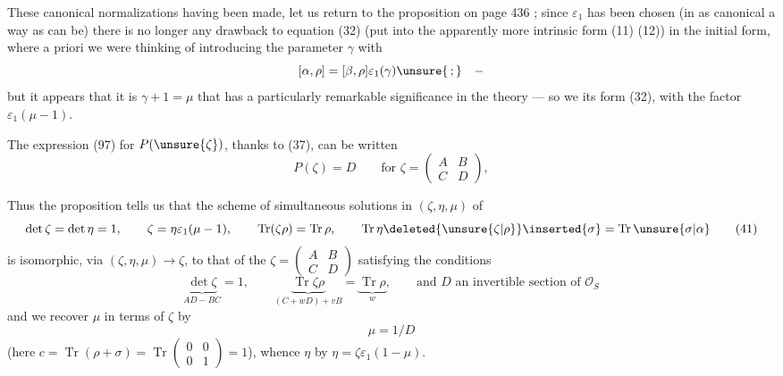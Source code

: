 
These canonical normalizations having been made, let us return to the proposition on page 436 ; since $\varepsilon_1$ has been chosen
(in as canonical a way as can be) there is no longer any drawback to
 equation (32) (put into the apparently more intrinsic form
(11)  (12)) in the  initial form,
where a priori we were thinking of introducing the parameter $\gamma$ with
\[
[\alpha,\rho]=[\beta,\rho]\varepsilon_1(\gamma)\unsure{\,;}\quad -
\]
but it appears that it is $\gamma+1=\mu$ that has a particularly remarkable significance
in the theory --- so we  its form (32), with the factor $\varepsilon_1(\mu-1)$.

The expression (97) for $P(\unsure{\zeta})$, thanks to (37), can be written
\[
P(\zeta)=D\qquad\text{for }\zeta=\begin{pmatrix}A&B\\C&D\end{pmatrix}, \tag{40}
\]


Thus the proposition tells us that the scheme 
of simultaneous solutions in $(\zeta,\eta,\mu)$ of
\[
\det\zeta=\det\eta=1,\qquad \zeta=\eta\varepsilon_1(\mu-1),\qquad
\operatorname{Tr}(\zeta\rho)=\operatorname{Tr}\rho,\qquad
\operatorname{Tr}\eta\deleted{\unsure{\zeta|\rho}}\inserted{\sigma}
=\operatorname{Tr}\unsure{\sigma|\alpha} \tag{41}
\]
is isomorphic, via $(\zeta,\eta,\mu)\longrightarrow\zeta$, to that of the
$\zeta=\begin{pmatrix}A&B\\C&D\end{pmatrix}$ satisfying the conditions
\[
\underbrace{\det\zeta}_{AD-BC}=1,\qquad
\underbrace{\operatorname{Tr}\zeta\rho}_{(C+wD)+vB}
=\underbrace{\operatorname{Tr}\rho}_{w},\qquad
\text{and }D\text{ an invertible section of }\mathcal O_S \tag{42}
\]
and we recover $\mu$ in terms of $\zeta$ by
\[
\mu=1/D \tag{43}
\]
(here $c=\operatorname{Tr}(\rho+\sigma)=\operatorname{Tr}\begin{pmatrix}0&0\\0&1\end{pmatrix}=1$),
whence $\eta$ by $\eta=\zeta\varepsilon_1(1-\mu)$.


